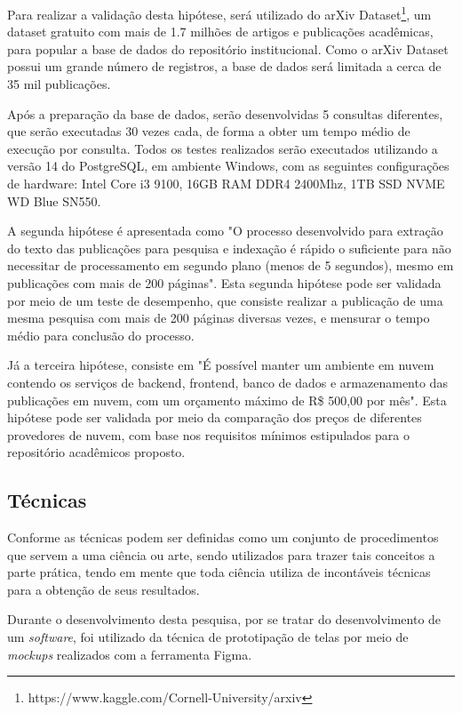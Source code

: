 Para realizar a validação desta hipótese, será utilizado do
arXiv Dataset\footnote{https://www.kaggle.com/Cornell-University/arxiv},
um dataset gratuito com mais de 1.7 milhões de artigos e publicações acadêmicas,
para popular a base de dados do repositório institucional. Como o arXiv Dataset
possui um grande número de registros, a base de dados será limitada
a cerca de 35 mil publicações.

Após a preparação da base de dados, serão desenvolvidas
5 consultas diferentes, que serão executadas 30 vezes cada, de forma a obter um tempo
médio de execução por consulta. Todos os testes realizados serão executados utilizando
a versão 14 do PostgreSQL, em ambiente Windows, com as seguintes configurações de hardware:
Intel Core i3 9100, 16GB RAM DDR4 2400Mhz, 1TB SSD NVME WD Blue SN550.

A segunda hipótese é apresentada como "O processo desenvolvido
para extração do texto das publicações para pesquisa e indexação
é rápido o suficiente para não necessitar de processamento em
segundo plano (menos de 5 segundos), mesmo em publicações com mais
de 200 páginas". Esta segunda hipótese pode ser validada por meio
de um teste de desempenho, que consiste realizar a publicação de uma
mesma pesquisa com mais de 200 páginas diversas vezes, e mensurar
o tempo médio para conclusão do processo.

Já a terceira hipótese, consiste em "É possível manter um ambiente
em nuvem contendo os serviços de backend, frontend, banco de dados
e armazenamento das publicações em nuvem, com um orçamento máximo
de R\$ 500,00 por mês". Esta hipótese pode ser validada por meio
da comparação dos preços de diferentes provedores de nuvem, com
base nos requisitos mínimos estipulados para o repositório
acadêmicos proposto.

\subsection{Técnicas}

Conforme \citep[p. 174]{LAKATOS2003:metodologia} as técnicas podem
ser definidas como um conjunto de procedimentos que servem a
uma ciência ou arte, sendo utilizados para trazer tais
conceitos a parte prática, tendo em mente que toda ciência utiliza
de incontáveis técnicas para a obtenção de seus resultados.

Durante o desenvolvimento desta pesquisa, por se tratar do
desenvolvimento de um \emph{software}, foi utilizado da técnica
de prototipação de telas por meio de \emph{mockups} realizados
com a ferramenta Figma.

